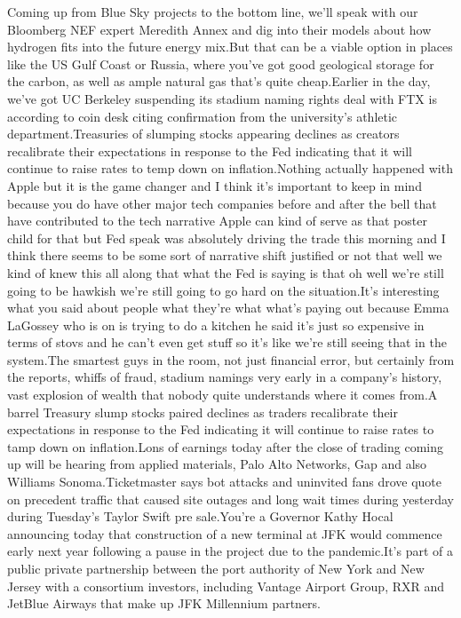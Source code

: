 \documentclass{article}%
\begin{document}
Coming up from Blue Sky projects to the bottom line, we'll speak with our Bloomberg NEF expert Meredith Annex and dig into their models about how hydrogen fits into the future energy mix.But that can be a viable option in places like the US Gulf Coast or Russia, where you've got good geological storage for the carbon, as well as ample natural gas that's quite cheap.Earlier in the day, we've got UC Berkeley suspending its stadium naming rights deal with FTX is according to coin desk citing confirmation from the university's athletic department.Treasuries of slumping stocks appearing declines as creators recalibrate their expectations in response to the Fed indicating that it will continue to raise rates to temp down on inflation.Nothing actually happened with Apple but it is the game changer and I think it's important to keep in mind because you do have other major tech companies before and after the bell that have contributed to the tech narrative Apple can kind of serve as that poster child for that but Fed speak was absolutely driving the trade this morning and I think there seems to be some sort of narrative shift justified or not that well we kind of knew this all along that what the Fed is saying is that oh well we're still going to be hawkish we're still going to go hard on the situation.It's interesting what you said about people what they're what what's paying out because Emma LaGossey who is on is trying to do a kitchen he said it's just so expensive in terms of stovs and he can't even get stuff so it's like we're still seeing that in the system.The smartest guys in the room, not just financial error, but certainly from the reports, whiffs of fraud, stadium namings very early in a company's history, vast explosion of wealth that nobody quite understands where it comes from.A barrel Treasury slump stocks paired declines as traders recalibrate their expectations in response to the Fed indicating it will continue to raise rates to tamp down on inflation.Lons of earnings today after the close of trading coming up will be hearing from applied materials, Palo Alto Networks, Gap and also Williams Sonoma.Ticketmaster says bot attacks and uninvited fans drove quote on precedent traffic that caused site outages and long wait times during yesterday during Tuesday's Taylor Swift pre sale.You're a Governor Kathy Hocal announcing today that construction of a new terminal at JFK would commence early next year following a pause in the project due to the pandemic.It's part of a public private partnership between the port authority of New York and New Jersey with a consortium investors, including Vantage Airport Group, RXR and JetBlue Airways that make up JFK Millennium partners.%
\end{document}
